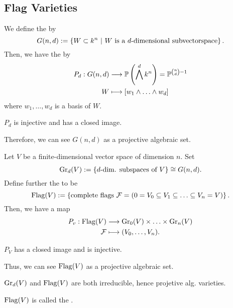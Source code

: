 
\subsection{Flag Varieties}

\begin{definition}
	We define the  by
	\[ G(n,d) := \left\lbrace W \subset k^n ~ | ~ W \text{ is a }d\text{-dimensional subvectorspace}\right\rbrace.  \]
	Then, we have the  by
	\begin{align*}
	P_d : G(n,d) & \overset{}{\longrightarrow} \mathbb{P} \left( \bigwedge^d k^n \right) = \mathbb{P}^{\binom{n}{d}-1}\\
	W & \longmapsto [w_1\wedge \ldots \wedge w_d]
	\end{align*}
	where $w_1,\ldots, w_d$ is a basis of $W$.
\end{definition}
\begin{lemma}
	$P_d$ is injective and has a closed image.
	
	Therefore, we can see $G(n,d)$ as a projective algebraic set.
\end{lemma}

\begin{definition}
Let $V$ be a finite-dimensional vector space of dimension $n$. Set
\[ \mathrm{Gr}_d(V) :=\left\lbrace d\text{-dim. subspaces of } V\right\rbrace \overset{}{\cong} G(n,d). \]
Define further the  to be
\[ \mathrm{Flag}(V) := \left\lbrace \text{complete flags } \mathcal{F} = (0 = V_0 \subseteq V_1 \subseteq \ldots \subseteq V_n = V) \right\rbrace. \]
Then, we have a map
\begin{align*}
P_v : \mathrm{Flag}(V) & \overset{}{\longrightarrow} \mathrm{Gr}_0(V) \times \ldots \times \mathrm{Gr}_n(V)\\
\mathcal{F} &\longmapsto (V_0,\ldots, V_n).
\end{align*}
\end{definition}
\begin{lemma}
	$P_V$ has a closed image and is injective.
	
	Thus, we can see $\mathrm{Flag}(V)$ as a projective algebraic set.
\end{lemma}

\begin{lemma}
	$\mathrm{Gr}_d(V)$ and $\mathrm{Flag}(V)$ are both irreducible, hence projetive alg. varieties.
	
	$\mathrm{Flag}(V)$ is called the .
\end{lemma}